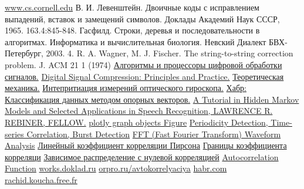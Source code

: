 \begin{thebibliography}{}
     \href{http://www.cs.cornell.edu/courses/cs4758/2012sp/materials/hmm_paper_rabiner.pdf}{www.cs.cornell.edu}
     В. И. Левенштейн. Двоичные коды с исправлением выпадений, вставок и
    замещений символов. Доклады Академий Наук СССР, 1965. 163.4:845-848.
     Гасфилд. Строки, деревья и последовательности в алгоритмах. Информатика и
    вычислительная биология. Невский Диалект БВХ-Петербург, 2003.
     4.	R. A. Wagner, M. J. Fischer. The string-to-string correction problem. J. ACM 21 1 (1974)
     \href{https://books.google.ru/books?id=iEO6AgAAQBAJ&pg=PA8&#v=onepage&q&f=false}{Алгоритмы и процессоры цифровой обработки сигналов.}
     \href{https://books.google.ru/books?id=s3H8s8rdsHkC&pg=PA83#v=onepage&q&f=false}{Digital Signal Compression: Principles and Practice.}
     \href{https://web.archive.org/web/20090708124031/http://mexman.ru/?p=6}{Теоретическая механика.}
     \href{http://journals.ioffe.ru/articles/viewPDF/8381}{Интепритиация измерений оптического гироскопа.}
     \href{https://habr.com/ru/post/105220/}{Хабр: Классификация данных методом опорных векторов.}
     \href{http://www.cs.cornell.edu/courses/cs4758/2012sp/materials/hmm_paper_rabiner.pdf}{A Tutorial in Hidden Markov Models and Selected Applications in Speech Recognition, LAWRENCE R. REBINER, FELLOW.}
    \bibitem{} \href{https://plotly.com/python-api-reference/generated/plotly.graph_objects.Figure.html}{plotly graph objects Figure}
    \bibitem{} \href{http://www.l3s.de/~anand/tir14/lectures/ws14-tir-foundations-2.pdf}{Periodicity Detection, Time-series Correlation, Burst Detection}
    \bibitem{} \href{https://www.dataq.com/data-acquisition/general-education-tutorials/fft-fast-fourier-transform-waveform-analysis.html}{FFT (Fast Fourier Transform) Waveform Analysis}
    \bibitem{} \href{https://statanaliz.info/statistica/korrelyaciya-i-regressiya/linejnyj-koefficient-korrelyacii-pirsona/}{Линейный коэффициент корреляции Пирсона}
    \bibitem{} \href{http://risktheory.novosyolov.com/topic_correl.htm}{Границы коэффициента корреляци}
    \bibitem{} \href{http://risktheory.novosyolov.com/ill_zerocorr.htm}{Зависимое распределение с нулевой корреляцией}
    \bibitem{} \href{https://s3.amazonaws.com/assets.datacamp.com/production/course_4267/slides/chapter2.pdf}{Autocorrelation Function}
    \bibitem{} \href{https://works.doklad.ru/view/b-Ph-NiLW_k/all.html}{works.doklad.ru}
    \bibitem{} \href{https://orpro.ru/avtokorrelyaciya-primer-resheniya-smotret-stranicy-gde-upominaetsya-termin/}{orpro.ru/avtokorrelyaciya}
    \bibitem{} \href{https://habr.com/ru/post/274175/}{habr.com}
    \bibitem{} \href{http://rachid.koucha.free.fr/tech_corner/pty_pdip.html}{rachid.koucha.free.fr}


\end{thebibliography}
